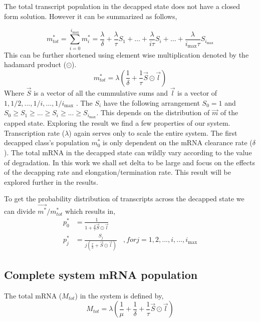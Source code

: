 \documentclass[review]{elsarticle}
\newcommand{\imax}{\ensuremath{{i_{\max}}}\xspace}
\begin{document}
The total transcript population in the decapped state does not have a closed form solution. However it can be summarized as follows,

\begin{equation}
	m_{tot}^{*} = \sum_{i=0}^{\imax} m_{i}^{*} = \frac{\lambda}{\delta} + \frac{\lambda}{\tau}S_{1} + \hdots + \frac{\lambda}{i \tau}S_{i} + \hdots  + \frac{\lambda}{\imax \tau}S_{\imax} 
\end{equation}
This can be further shortened using element wise multiplication denoted by the hadamard product ($\odot$).
\begin{equation}  
	m_{tot}^{*} = \lambda(\frac{1}{\delta} + \frac{1}{\tau}\vec{S} \odot \vec{l}	) 
\end{equation}
Where $\vec{S}$ is a vector of all the cummulative sums and $\vec{l}$ is a vector of $1,1/2,...,1/i,...,1/\imax$ . The $S_{i}$ have the following arrangement $S_{0}=1$ and $ S_{0} \ge S_{1} \ge ... \ge S_{i} \ge ... \ge S_{\imax}$. This depends on the distribution of $\vec{m}$ of the capped state. Exploring the result we find a few properties of our system. Transcription rate ($\lambda$) again serves only to scale the entire system. The first decapped class's population $m_{0}^{*}$ is only dependent on the mRNA clearance rate ($\delta$). The total mRNA in the decapped state can wildly vary according to the value of degradation. In this work we shall set delta to be large and focus on the effects of the decapping rate and elongation/termination rate. This result will be explored further in the results.

To get the probability distribution of transcripts across the decapped state we can divide $\vec{m^{*}}/m_{tot}^{*}$ which results in,
\begin{align*}
	p_{0}^{*} &= \frac{1}{1 + \frac{\delta}{\tau}\vec{S} \odot \vec{l}}	\\
  	p_{j}^{*} &= \frac{S_{j}}{j(\frac{\tau}{\delta} + \vec{S} \odot \vec{l})}	\:\:\:\:, for j=1, 2, ..., i, ..., \imax
\end{align*}






\subsection{Complete system mRNA population}
The total mRNA ($M_{tot}$) in the system is defined by,
\begin{equation}
	M_{tot} = \lambda(\frac{1}{\mu} + \frac{1}{\delta} + \frac{1}{\tau}\vec{S} \odot \vec{l}	) 
\end{equation}
\end{document}
